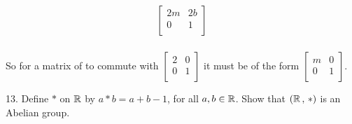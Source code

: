 \begin{mdframed}[style=darkAnswer,frametitle={Joe Starr}]
\begin{multicols}{2}
\begin{align*}
\begin{bmatrix}
      2m & 2b \\
      0      & 1          \\
    \end{bmatrix}                            \\
  \end{align*}
\end{multicols}
So for a matrix of to commute with $\begin{bmatrix}
  2 & 0\\
  0 & 1\\
\end{bmatrix}$ it must be of the form $\begin{bmatrix}
  m & 0\\
  0 & 1\\
\end{bmatrix}$.
\end{mdframed}
\newpage
\begin{mdframed}[style=darkQuesion]
  13. Define $\ast$ on $\mathbb{R}$ by $a\ast b = a+b-1$, for all $a,b\in \mathbb{R}$. Show that
  $\left(\mathbb{R}\,,\,\ast\right)$ is an Abelian group.
\end{mdframed}

